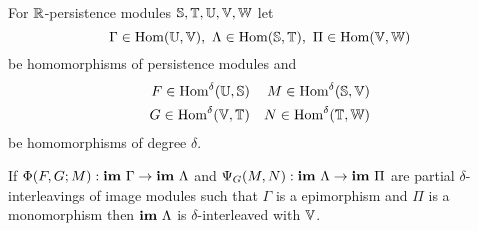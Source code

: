 %


\begin{theorem}\label{thm:interleaving_main}
  For $\mathbb{R}$-persistence modules $\mathbb{S}, \mathbb{T}, \mathbb{U}, \mathbb{V}, \mathbb{W}$ let
  \[ \Gamma\in\Hom(\U,\V),\ \Lambda\in\Hom(\S, \T),\ \Pi\in\Hom(\V,\W)\]
  be homomorphisms of persistence modules and
  \begin{align*}
    F\in\mathrm{Hom}^\delta(\mathbb{U},\mathbb{S})& & M\in\mathrm{Hom}^\delta(\mathbb{S},\mathbb{V})\\
    G\in\mathrm{Hom}^\delta(\mathbb{V},\mathbb{T})& & N\in\mathrm{Hom}^\delta(\mathbb{T},\mathbb{W})
  \end{align*}
  be homomorphisms of degree $\delta$.

  If $\Phi(F, G; M) :\mathbf{im}~\Gamma\to\mathbf{im}~\Lambda$ and $\Psi_G(M, N): \mathbf{im}~\Lambda\to\mathbf{im}~\Pi$ are partial $\delta$-interleavings of image modules such that $\Gamma$ is a epimorphism and $\Pi$ is a monomorphism then $\mathbf{im}~\Lambda$ is $\delta$-interleaved with $\mathbb{V}$.
\end{theorem}
